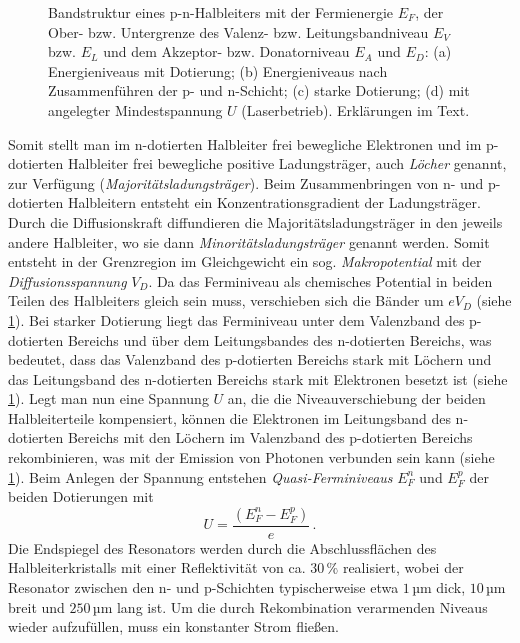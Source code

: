 \begin{figure}[h]
{{{	  	}
	}}
	\caption[Bandstruktur Halbleiterlaser]{Bandstruktur eines
	p-n-Halbleiters mit der Fermienergie $E_F$, der Ober- bzw. Untergrenze des Valenz- bzw.
	Leitungsbandniveau $E_V$ bzw. $E_L$ und dem Akzeptor- bzw. Donatorniveau $E_A$
	und $E_D$:
	(a) Energieniveaus mit Dotierung; (b) Energieniveaus nach
	Zusammenführen der p- und n-Schicht; (c) starke
	Dotierung; (d) mit angelegter Mindestspannung $U$
	(Laserbetrieb). Erklärungen im
	Text.}
	\label{fig:pn-halbleiter}
\end{figure}
Somit stellt
man im n-dotierten Halbleiter frei bewegliche Elektronen und im p-dotierten Halbleiter frei bewegliche positive
Ladungsträger, auch \textit{Löcher} genannt, zur Verfügung
(\textit{Majoritätsladungsträger}). Beim Zusammenbringen von n- und p-dotierten
Halbleitern entsteht ein Konzentrationsgradient der
Ladungsträger. Durch die Diffusionskraft diffundieren die
Majoritätsladungsträger in den jeweils andere Halbleiter, wo sie dann
\textit{Minoritätsladungsträger} genannt werden. Somit entsteht in der
Grenzregion im Gleichgewicht ein sog. \textit{Makropotential} mit der \textit{Diffusionsspannung} $V_D$. Da
das Ferminiveau als chemisches Potential in beiden Teilen des Halbleiters gleich
sein muss, verschieben sich die Bänder um $eV_D$ (siehe
\ref{fig:pn-halbleiter}). Bei starker Dotierung
liegt das Ferminiveau unter dem Valenzband des p-dotierten Bereichs und über dem Leitungsbandes des
n-dotierten Bereichs, was bedeutet, dass das Valenzband des p-dotierten Bereichs
stark mit Löchern und das Leitungsband des n-dotierten Bereichs stark mit
Elektronen besetzt ist (siehe
\ref{fig:pn-halbleiter}). Legt man nun eine Spannung $U$ an, die die Niveauverschiebung der beiden Halbleiterteile
kompensiert, können die Elektronen im Leitungsband des n-dotierten Bereichs mit
den Löchern im Valenzband des p-dotierten Bereichs rekombinieren, was mit der
Emission von Photonen verbunden sein kann (siehe
\ref{fig:pn-halbleiter}).
Beim Anlegen der Spannung entstehen \textit{Quasi-Ferminiveaus} $E_F^n$ und $E_F^p$ der beiden Dotierungen mit
\begin{equation}\label{eq:quasi-ferminiveaus}
	U=\frac{\left(E_F^n-E_F^p\right)}{e}\,.
\end{equation}
Die Endspiegel des Resonators werden durch die Abschlussflächen des
Halbleiterkristalls mit einer Reflektivität von ca. $30\,\%$ realisiert, wobei der Resonator
zwischen den n- und p-Schichten typischerweise etwa $1\,$µm dick, $10\,$µm breit
und $250\,$µm lang ist. Um die durch Rekombination verarmenden Niveaus wieder aufzufüllen,
muss ein konstanter Strom fließen.

